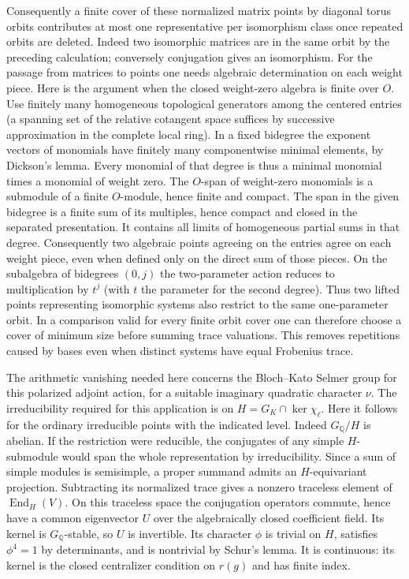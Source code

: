 \documentclass[11pt]{amsart}
\theoremstyle{definition}
\theoremstyle{remark}
\begin{document}
Consequently a finite cover of these normalized matrix points by
diagonal torus orbits contributes at most one representative per
isomorphism class once repeated orbits are deleted. Indeed two
isomorphic matrices are in the same orbit by the preceding calculation;
conversely conjugation gives an isomorphism. For the passage from
matrices to points one needs algebraic determination on each weight
piece. Here is the argument when the closed weight-zero algebra is
finite over $O$. Use finitely many homogeneous topological generators
among the centered entries (a spanning set of the relative cotangent
space suffices by successive approximation in the complete local
ring). In a fixed bidegree the exponent vectors of monomials have
finitely many componentwise minimal elements, by Dickson's lemma.
Every monomial of that degree is thus a minimal monomial times a
monomial of weight zero. The $O$-span of weight-zero monomials is
a submodule of a finite $O$-module, hence finite and compact.
The span in the given bidegree is a finite sum of its multiples,
hence compact and closed in the separated presentation. It contains
all limits of homogeneous partial sums in that degree. Consequently
two algebraic points agreeing on the entries agree on each weight
piece, even when defined only on the direct sum of those pieces.
On the subalgebra of
bidegrees $(0,j)$ the two-parameter action reduces to multiplication
by $t^j$ (with $t$ the parameter for the second degree).
Thus two lifted points representing isomorphic systems also restrict
to the same one-parameter orbit. In a comparison valid for every
finite orbit cover one can therefore choose a cover of minimum size
before summing trace valuations. This removes repetitions caused by
bases even when distinct systems have equal Frobenius trace.

The arithmetic vanishing needed here concerns the Bloch--Kato
Selmer group for this polarized adjoint action, for a suitable
imaginary quadratic character $\nu$. The irreducibility required
for this application is on $H=G_K\cap\ker\chi_\ell$. Here it follows
for the ordinary irreducible points with the indicated level.
Indeed $G_{\mathbb Q}/H$ is abelian. If the restriction were
reducible, the conjugates of any simple $H$-submodule would span
the whole representation by irreducibility. Since a sum of simple
modules is semisimple, a proper summand admits an $H$-equivariant
projection. Subtracting its normalized trace gives a nonzero
traceless element of $\operatorname{End}_H(V)$. On this traceless
space the conjugation operators commute, hence have a common
eigenvector $U$ over the algebraically closed coefficient field.
Its kernel is $G_{\mathbb Q}$-stable, so $U$ is invertible. Its
character $\phi$ is trivial on $H$, satisfies $\phi^4=1$ by
determinants, and is nontrivial by Schur's lemma. It is continuous:
its kernel is the closed centralizer condition on $r(g)$ and has
finite index.
\end{document}
